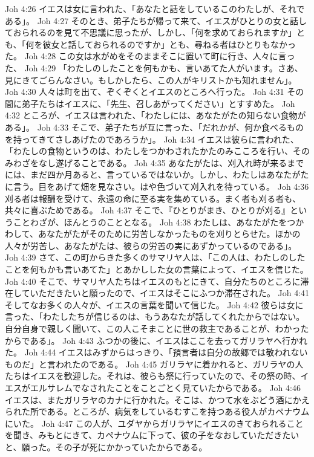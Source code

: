 Joh 4:26  イエスは女に言われた、「あなたと話をしているこのわたしが、それである」。
Joh 4:27  そのとき、弟子たちが帰って来て、イエスがひとりの女と話しておられるのを見て不思議に思ったが、しかし、「何を求めておられますか」とも、「何を彼女と話しておられるのですか」とも、尋ねる者はひとりもなかった。
Joh 4:28  この女は水がめをそのままそこに置いて町に行き、人々に言った、
Joh 4:29  「わたしのしたことを何もかも、言いあてた人がいます。さあ、見にきてごらんなさい。もしかしたら、この人がキリストかも知れません」。
Joh 4:30  人々は町を出て、ぞくぞくとイエスのところへ行った。
Joh 4:31  その間に弟子たちはイエスに、「先生、召しあがってください」とすすめた。
Joh 4:32  ところが、イエスは言われた、「わたしには、あなたがたの知らない食物がある」。
Joh 4:33  そこで、弟子たちが互に言った、「だれかが、何か食べるものを持ってきてさしあげたのであろうか」。
Joh 4:34  イエスは彼らに言われた、「わたしの食物というのは、わたしをつかわされたかたのみこころを行い、そのみわざをなし遂げることである。
Joh 4:35  あなたがたは、刈入れ時が来るまでには、まだ四か月あると、言っているではないか。しかし、わたしはあなたがたに言う。目をあげて畑を見なさい。はや色づいて刈入れを待っている。
Joh 4:36  刈る者は報酬を受けて、永遠の命に至る実を集めている。まく者も刈る者も、共々に喜ぶためである。
Joh 4:37  そこで、『ひとりがまき、ひとりが刈る』ということわざが、ほんとうのこととなる。
Joh 4:38  わたしは、あなたがたをつかわして、あなたがたがそのために労苦しなかったものを刈りとらせた。ほかの人々が労苦し、あなたがたは、彼らの労苦の実にあずかっているのである」。
Joh 4:39  さて、この町からきた多くのサマリヤ人は、「この人は、わたしのしたことを何もかも言いあてた」とあかしした女の言葉によって、イエスを信じた。
Joh 4:40  そこで、サマリヤ人たちはイエスのもとにきて、自分たちのところに滞在していただきたいと願ったので、イエスはそこにふつか滞在された。
Joh 4:41  そしてなお多くの人々が、イエスの言葉を聞いて信じた。
Joh 4:42  彼らは女に言った、「わたしたちが信じるのは、もうあなたが話してくれたからではない。自分自身で親しく聞いて、この人こそまことに世の救主であることが、わかったからである」。
Joh 4:43  ふつかの後に、イエスはここを去ってガリラヤへ行かれた。
Joh 4:44  イエスはみずからはっきり、「預言者は自分の故郷では敬われないものだ」と言われたのである。
Joh 4:45  ガリラヤに着かれると、ガリラヤの人たちはイエスを歓迎した。それは、彼らも祭に行っていたので、その祭の時、イエスがエルサレムでなされたことをことごとく見ていたからである。
Joh 4:46  イエスは、またガリラヤのカナに行かれた。そこは、かつて水をぶどう酒にかえられた所である。ところが、病気をしているむすこを持つある役人がカペナウムにいた。
Joh 4:47  この人が、ユダヤからガリラヤにイエスのきておられることを聞き、みもとにきて、カペナウムに下って、彼の子をなおしていただきたいと、願った。その子が死にかかっていたからである。
